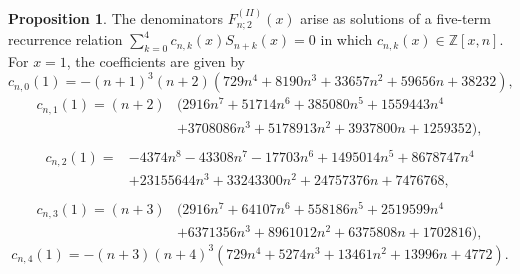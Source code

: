 \documentclass[a4paper,12pt,oneside]{article}
\theoremstyle{definition}
\newtheorem{prop}[defi]{Proposition}
\newcommand{\Z}{\mathbb{Z}}
\begin{document}
\begin{prop}
    The denominators $F_{n;2}^{(II)}(x)$ arise as solutions of a five-term recurrence relation $\sum_{k=0}^4 c_{n,k}(x) S_{n+k}(x)=0$ in which $c_{n,k}(x)\in\Z[x,n]$.
    For $x=1$, the coefficients are given by
    $$c_{n,0}(1) = -(n + 1)^3(n + 2)(729n^4 + 8190n^3 + 33657n^2 + 59656n + 38232), $$
    $$\begin{aligned}
        c_{n,1}(1) = (n + 2)&(2916n^7 + 51714n^6 + 385080n^5 + 1559443n^4 \\
        & + 3708086n^3 + 5178913n^2 + 3937800n + 1259352), \\
    \end{aligned} $$
    $$\begin{aligned}
        c_{n,2}(1) = &-4374n^8 - 43308n^7 - 17703n^6 + 1495014n^5 + 8678747n^4 \\
        & + 23155644n^3 + 33243300n^2 + 24757376n + 7476768, \\
    \end{aligned}$$
    $$\begin{aligned}
        c_{n,3}(1) = (n + 3)&(2916n^7 + 64107n^6 + 558186n^5 + 2519599n^4 \\
        & + 6371356n^3 + 8961012n^2 + 6375808n + 1702816),
    \end{aligned}$$
    $$c_{n,4}(1) = -(n + 3)(n + 4)^3(729n^4 + 5274n^3 + 13461n^2 + 13996n + 4772).$$

\end{prop}
\end{document}
